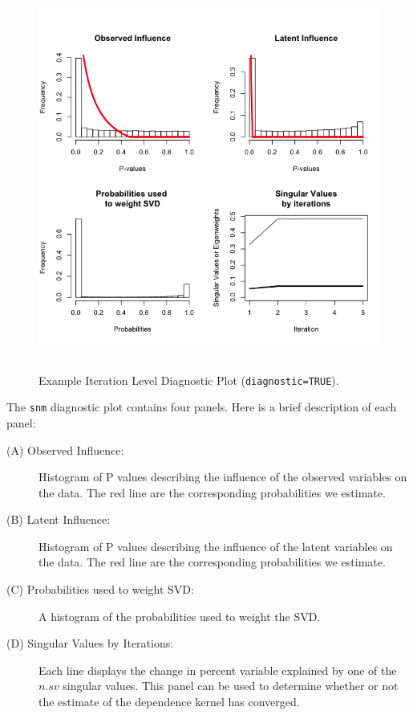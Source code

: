 \documentclass[11pt]{article}
\newcommand{\Rfunction}[1]{{\texttt{#1}}}
\begin{document}
\begin{figure}[pt]
  \begin{center}
    \includegraphics[width=5in,height=5in]{sva_egDiagPlot.png}
  \end{center}
  \caption{Example Iteration Level Diagnostic Plot ({\tt diagnostic=TRUE}).}\label{fig:sva_diagPlot1}
\end{figure}

The \Rfunction{snm} diagnostic plot contains four panels.  Here is a brief description of each panel:

\begin{description}
  \item[(A) Observed Influence:]   Histogram of P values describing the influence of the observed variables on the data.  The red line are the corresponding probabilities we estimate.
  \item[(B) Latent Influence:] Histogram of P values describing the influence of the latent variables on the data.  The red line are the corresponding probabilities we estimate.
  \item[(C) Probabilities used to weight SVD: ] A histogram of the probabilities used to weight the SVD.
  \item[(D) Singular Values by Iterations:] Each line displays the change in percent variable explained by one of the $n.sv$ singular values.  This panel can be used to determine whether or not the estimate of the dependence kernel has converged.
\end{description}
\end{document}
